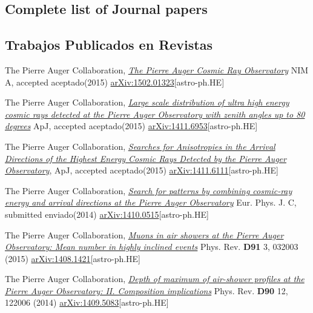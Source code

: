 \ifeng
\subsection*{Complete list of Journal papers}
\else
\subsection*{Trabajos Publicados en Revistas}
\fi
\noindent
\begin{etaremune}

\item {}The Pierre Auger Collaboration, \href{http://dx.doi.org/}{\emph{The Pierre Auger Cosmic Ray Observatory}} NIM A, \ifeng accepted \else aceptado\fi (2015) \href{http://arxiv.org/abs/1502.01323}{arXiv:1502.01323}[astro-ph.HE]

\item {}The Pierre Auger Collaboration, \href{http://dx.doi.org/}{\emph{Large scale distribution of ultra high energy cosmic rays detected at the Pierre Auger Observatory with zenith angles up to 80 degrees}} ApJ, \ifeng accepted \else aceptado\fi (2015) \href{http://arxiv.org/abs/1411.6953}{arXiv:1411.6953}[astro-ph.HE]

\item {}The Pierre Auger Collaboration, \href{http://dx.doi.org/}{\emph{Searches for Anisotropies in the Arrival Directions of the Highest Energy Cosmic Rays Detected by the Pierre Auger Observatory}}, ApJ, \ifeng accepted \else aceptado\fi (2015) \href{http://arxiv.org/abs/1411.6111}{arXiv:1411.6111}[astro-ph.HE]

\item {}The Pierre Auger Collaboration, \href{http://dx.doi.org/}{\emph{Search for patterns by combining cosmic-ray energy and arrival directions at the Pierre Auger Observatory}} Eur. Phys. J. C, \ifeng submitted \else enviado\fi (2014) \href{http://arxiv.org/abs/1410.0515}{arXiv:1410.0515}[astro-ph.HE]

\item {}The Pierre Auger Collaboration, \href{http://dx.doi.org/10.1103/PhysRevD.91.032003}{\emph{Muons in air showers at the Pierre Auger Observatory: Mean number in highly inclined events}} Phys. Rev. {\bf{D91}} 3, 032003 (2015) \href{http://arxiv.org/abs/1408.1421}{arXiv:1408.1421}[astro-ph.HE]

\item {}The Pierre Auger Collaboration, \href{http://dx.doi.org/10.1103/PhysRevD.90.122006}{\emph{Depth of maximum of air-shower profiles at the Pierre Auger Observatory: II. Composition implications}} Phys. Rev. {\bf{D90}} 12, 122006 (2014) \href{http://arxiv.org/abs/1409.5083}{arXiv:1409.5083}[astro-ph.HE]


\end{etaremune}
